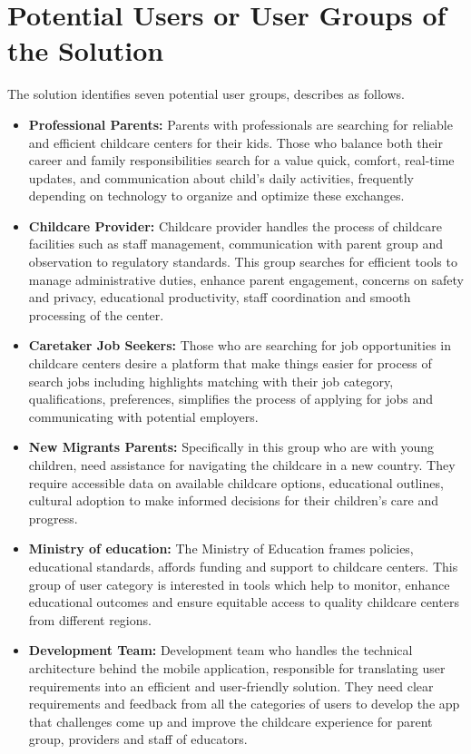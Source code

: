 \section{Potential Users or User Groups of the Solution}

The solution identifies seven potential user groups, describes as follows. 


\begin{itemize}
    \item \textbf{Professional Parents:} Parents with professionals are searching for reliable and efficient childcare centers for their kids. Those who balance both their career and family responsibilities search for a value quick, comfort, real-time updates, and communication about child’s daily activities, frequently depending on technology to organize and optimize these exchanges.
    \item \textbf{Childcare Provider:} Childcare provider handles the process of childcare facilities such as staff management, communication with parent group and observation to regulatory standards. This group searches for efficient tools to manage administrative duties, enhance parent engagement, concerns on safety and privacy, educational productivity, staff coordination and smooth processing of the center.
    \item \textbf{Caretaker Job Seekers:} Those who are searching for job opportunities in childcare centers desire a platform that make things easier for process of search jobs including highlights matching with their job category, qualifications, preferences, simplifies the process of applying for jobs and communicating with potential employers.
    \item \textbf{New Migrants Parents:} Specifically in this group who are with young children, need assistance for navigating the childcare in a new country. They require accessible data on available childcare options, educational outlines, cultural adoption to make informed decisions for their children’s care and progress. 
    \item \textbf{Ministry of education:} The Ministry of Education frames policies, educational standards, affords funding and support to childcare centers. This group of user category is interested in tools which help to monitor, enhance educational outcomes and ensure equitable access to quality childcare centers from different regions.
    \item \textbf{Development Team:} Development team who handles the technical architecture behind the mobile application, responsible for translating user requirements into an efficient and user-friendly solution. They need clear requirements and feedback from all the categories of users to develop the app that challenges come up and improve the childcare experience for parent group, providers and staff of educators.

\end{itemize}
